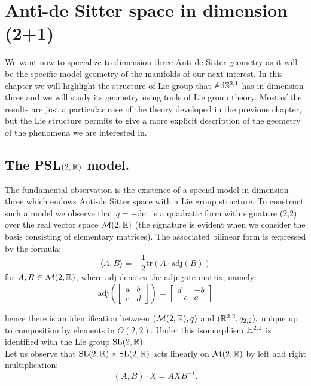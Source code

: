 \chapter{Anti-de Sitter space in dimension (2+1)}
We want now to specialize to dimension three Anti-de Sitter geometry as it will be the specific model geometry of the manifolds of our next interest. In this chapter we will highlight the structure of Lie group that $\mathbb{A}\mathrm{d}\mathbb{S}^{2,1}$ has in dimension three and we will study its geometry using tools of Lie group theory. Most of the results are just a particular case of the theory developed in the previous chapter, but the Lie structure permits to give a more explicit description of the geometry of the phenomena we are interested in.\\

\section{The {PSL}$(2,\mathbb{R})$ model.} 
The fundamental observation is the existence of a special model in dimension three which endows Anti-de Sitter space with a Lie group structure. To construct such a model we observe that $q=-$det is a quadratic form with signature (2,2) over the real vector space $\mathcal{M}(2,\mathbb{R})$ (the signature is evident when we consider the basis consisting of elementary matrices). The associated bilinear form is expressed by the formula:
\begin{equation}\label{quadratic}
    \langle A,B\rangle=-\frac{1}{2}\text{tr}(A\cdot\text{adj}(B))
\end{equation}
for $A,B\in\mathcal{M}(2,\mathbb{R})$, where adj denotes the adjugate matrix, namely: 
\[
    \text{adj}(\begin{bmatrix}
        a & b \\
        c & d
    \end{bmatrix}) = \begin{bmatrix}
        d & -b \\
        -c & a
    \end{bmatrix}
\]

hence there is an identification between $(\mathcal{M}(2,\mathbb{R}),q)$ and $(\mathbb{R}^{2,2}, q_{2,2}),$ unique up to composition by elements in $O(2,2)$. Under this isomorphism $\mathbb{H}^{2,1}$ is identified with the Lie group $\text{SL}(2,\mathbb{R}).$\\
Let us observe that $\text{SL}(2,\mathbb{R})\times \text{SL}(2,\mathbb{R})$ acts linearly on $\mathcal{M}(2,\mathbb{R})$ by left and right multiplication:
$$(A,B)\cdot X=AXB^{-1}.$$

